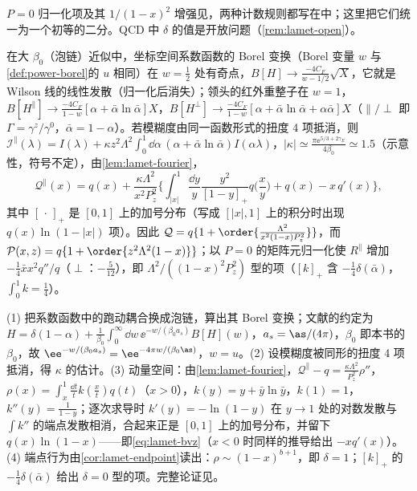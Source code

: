 $P=0$ 归一化项及其 $1/(1-x)^2$ 增强见\cite{Braun:2018brg}，两种计数规则都写在\cite{JiEtAl2021}中；这里把它们统一为一个初等的二分。QCD 中 $\delta$ 的值是开放问题（\cref{rem:lamet-open}）。

\begin{proposition}\label{prop:lamet-bvz}
在大 $\beta_0$（泡链）近似中，坐标空间系数函数的 Borel 变换（Borel 变量 $w$ 与\cref{def:power-borel}的 $u$ 相同）在 $w=\frac12$ 处有奇点，$B[H]\to\frac{-4C_F}{w-1/2}\sqrt X$，它就是 Wilson 线的线性发散（归一化后消失）；领头的红外重整子在 $w=1$，$B[H^\parallel]\to\frac{-4C_F}{1-w}[\alpha+\bar\alpha\ln\bar\alpha]X$，$B[H^\perp]\to\frac{-4C_F}{1-w}[\alpha+\bar\alpha\ln\bar\alpha+\alpha\bar\alpha]X$（$\parallel/\perp$ 即 $\Gamma=\gamma^z/\gamma^0$，$\bar\alpha=1-\alpha$）。若模糊度由同一函数形式的扭度 4 项抵消，则 $\mathcal I^\parallel(\lambda)=I(\lambda)+\kappa z^2\Lambda^2\int_0^1\dd\alpha\,(\alpha+\bar\alpha\ln\bar\alpha)I(\alpha\lambda)$，$|\kappa|\simeq\frac{\pi\ee^{5/3+2\gamma_E}}{4\beta_0}\simeq1.5$（示意性，符号不定），由\cref{lem:lamet-fourier}，
\begin{equation}\label{eq:lamet-bvz}
\mathcal Q^\parallel(x)=q(x)+\frac{\kappa\Lambda^2}{x^2P_z^2}\Big\{\int_{|x|}^1\frac{\dd y}y\frac{y^2}{[1-y]_+}q\Big(\frac xy\Big)+q(x)-x\,q'(x)\Big\},
\end{equation}%
其中 $[\,\cdot\,]_+$ 是 $[0,1]$ 上的加号分布（写成 $[|x|,1]$ 上的积分时出现 $q(x)\ln(1-|x|)$ 项）。因此 $\mathcal Q=q\{1+\order{\frac{\Lambda^2}{x^2(1-x)P_z^2}}\}$，而 $\mathcal P(x,z)=q\{1+\order{z^2\Lambda^2(1-x)}\}$；以 $P=0$ 的矩阵元归一化使 $R^\parallel$ 增加 $-\frac14\bar xx^2q''/q$（$\perp$：$-\frac5{12}$），即 $\Lambda^2/((1-x)^2P_z^2)$ 型的项（$[k]_+$ 含 $-\frac14\delta(\bar\alpha)$，$\int_0^1k=\frac14$）。
\end{proposition}

\begin{proofsketch}
(1) 把系数函数中的跑动耦合换成泡链，算出其 Borel 变换\cite{Braun:2018brg}；文献的约定为 $H=\delta(1-\alpha)+\frac1{\beta_0}\int_0^\infty\dd w\,\ee^{-w/(\beta_0a_s)}B[H](w)$，$a_s=\as/(4\pi)$，$\beta_0$ 即本书的 $\beta_0$，故 $\ee^{-w/(\beta_0a_s)}=\ee^{-4\pi w/(\beta_0\as)}$，$w=u$。(2) 设模糊度被同形的扭度 4 项抵消，得 $\kappa$ 的估计。(3) 动量空间：由\cref{lem:lamet-fourier}，$\mathcal Q^\parallel-q=\frac{\kappa\Lambda^2}{P_z^2}\rho''$，$\rho(x)=\int_x^1\frac{\dd t}tk(\frac xt)q(t)$（$x>0$），$k(y)=y+\bar y\ln\bar y$，$k(1)=1$，$k''(y)=\frac1{1-y}$；逐次求导时 $k'(y)=-\ln(1-y)$ 在 $y\to1$ 处的对数发散与 $\int k''$ 的端点发散相消，合起来正是 $[0,1]$ 上的加号分布，并留下 $q(x)\ln(1-x)$——即\cref{eq:lamet-bvz}（$x<0$ 时同样的推导给出 $-xq'(x)$）。(4) 端点行为由\cref{cor:lamet-endpoint}读出：$\rho\sim(1-x)^{b+1}$，即 $\delta=1$；$[k]_+$ 的 $-\frac14\delta(\bar\alpha)$ 给出 $\delta=0$ 型的项。完整论证见\cite{Braun:2018brg}。
\end{proofsketch}

